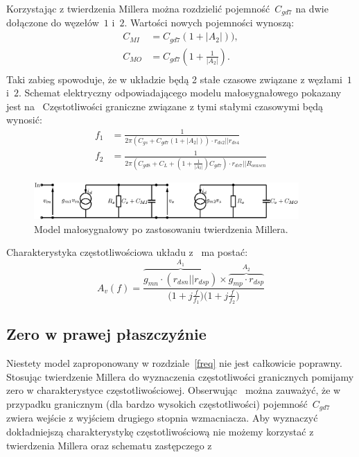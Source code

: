 \documentclass[twoside,pl,final]{labman}
\begin{document}
Korzystając z twierdzenia Millera można rozdzielić
pojemność~$C_{gd7}$ na dwie dołączone do węzełów~$1$ i~$2$.
Wartości nowych pojemności wynoszą:
\begin{align}
  C_{MI} &= C_{gd7}(1 + |A_2|)), \\
  C_{MO} &= C_{gd7}(1 + \frac{1}{|A_2|}). \\
\end{align}
Taki zabieg spowoduje, że w układzie będą
2 stałe czasowe związane z węzłami~$1$ i~$2$.
Schemat elektryczny odpowiadającego modelu
małosygnałowego pokazany jest na~
Częstotliwości graniczne związane z tymi stałymi czasowymi będą wynosić:
\begin{align}
  f_1 &= \frac{1}{2 \pi (C_{gs} + C_{gd7}(1 + |A_2|)) \cdot r_{ds2} || r_{ds4}}
  \label{eqn:freq:pole:low} \\
  f_2 &= \frac{1}{2 \pi (C_{gd8} + C_L + (1 + \frac{1}{|A_2|})C_{gd7}) \cdot
  r_{ds7} || R_{ocascn}}
  \label{eqn:freq:pole:high}
\end{align}

\begin{figure}[!htbp]
  \centering
  \includegraphics[width=0.9\textwidth]{miller}
  \caption{Model małosygnałowy po zastosowaniu twierdzenia Millera.}
  \label{fig:miller}
\end{figure}

Charakterystyka częstotliwościowa układu z~ ma postać:
\begin{equation}
  A_v(f) = \frac{\overbrace{g_{mn} \cdot (r_{dsn} || r_{dsp})}^{A_1} \times
                 \overbrace{g_{mp} \cdot r_{dsp}}^{A_2}}
                {\Big(1 + j \frac{f}{f_1}\Big)\Big(1 + j \frac{f}{f_2}\Big)}
\end{equation}

\subsection{Zero w prawej płaszczyźnie}
\label{freq:rhp}
Niestety model zaproponowany w rozdziale~\ref{freq}
nie jest całkowicie poprawny.
Stosując twierdzenie Millera do wyznaczenia częstotliwości granicznych
pomijamy zero w charakterystyce częstotliwościowej.
Obserwując~ można zauważyć,
że w przypadku granicznym (dla bardzo wysokich częstotliwości)
pojemność~$C_{gd7}$ zwiera wejście z wyjściem drugiego stopnia wzmacniacza.
Aby wyznaczyć dokładniejszą charakterystykę częstotliwościową
nie możemy korzystać z twierdzenia Millera
oraz schematu zastępczego z~
\end{document}
